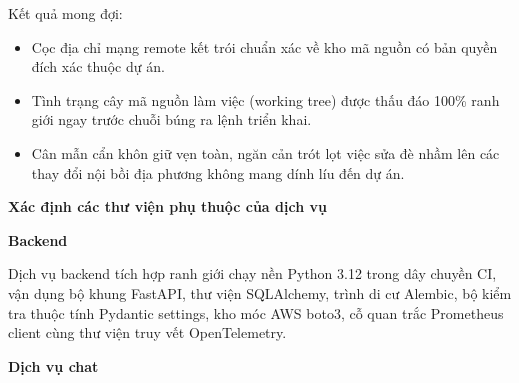 Kết quả mong đợi:

\begin{itemize}
\tightlist
\item
  Cọc địa chỉ mạng remote kết trói chuẩn xác về kho mã nguồn có bản
  quyền đích xác thuộc dự án.
\item
  Tình trạng cây mã nguồn làm việc (working tree) được thấu đáo 100\%
  ranh giới ngay trước chuỗi búng ra lệnh triển khai.
\item
  Cân mẫn cẩn khôn giữ vẹn toàn, ngăn cản trót lọt việc sửa đè nhầm lên
  các thay đổi nội bồi địa phương không mang dính líu đến dự án.
\end{itemize}

\vspace{0.5em}\noindent\textbf{Xác định các thư viện phụ thuộc của dịch
vụ}\par

\vspace{0.5em}\noindent\textbf{Backend}\par

\begin{Shaded}
\begin{Highlighting}[]
 
 
 
 
  
\end{Highlighting}
\end{Shaded}

Dịch vụ backend tích hợp ranh giới chạy nền Python 3.12 trong dây chuyền
CI, vận dụng bộ khung FastAPI, thư viện SQLAlchemy, trình di cư Alembic,
bộ kiểm tra thuộc tính Pydantic settings, kho móc AWS boto3, cỗ quan
trắc Prometheus client cùng thư viện truy vết OpenTelemetry.

\vspace{0.5em}\noindent\textbf{Dịch vụ chat}\par

\begin{Shaded}
\begin{Highlighting}[]
\end{Highlighting}
\end{Shaded}

